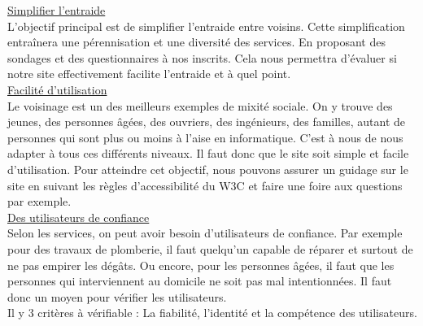 \documentclass[a4paper,11pt]{article}
\begin{document}




\underline{Simplifier l'entraide}\\

L'objectif principal est de simplifier l'entraide entre voisins.
Cette simplification entraînera une pérennisation et une diversité des services.
En proposant des sondages et des questionnaires à nos inscrits.
Cela nous permettra d'évaluer si notre site effectivement facilite l'entraide et à quel point.\\

\underline{Facilité d'utilisation}\\

Le voisinage est un des meilleurs exemples de mixité sociale.
On y trouve des jeunes, des personnes âgées, des ouvriers, des ingénieurs, des familles, autant de personnes qui sont plus ou moins à l'aise en informatique.
C'est à nous de nous adapter à tous ces différents niveaux. Il faut donc que le site soit simple et facile d'utilisation.
Pour atteindre cet objectif, nous pouvons assurer un guidage sur le site en suivant les règles d'accessibilité du W3C et faire une foire aux questions par exemple.\\

\underline{Des utilisateurs de confiance}\\

Selon les services, on peut avoir besoin d'utilisateurs de confiance.
Par exemple pour des travaux de plomberie, il faut quelqu'un capable de réparer et surtout de ne pas empirer les dégâts.
Ou encore, pour les personnes âgées, il faut que les personnes qui interviennent au domicile ne soit pas mal intentionnées.
Il faut donc un moyen pour vérifier les utilisateurs.\\
Il y 3 critères à vérifiable : La fiabilité, l'identité et la compétence des utilisateurs.\\
\end{document}
